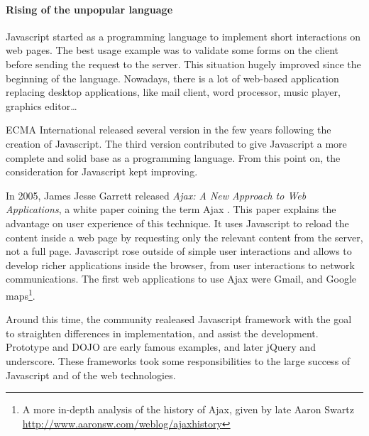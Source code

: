 
\paragraph{Rising of the unpopular language}


Javascript started as a programming language to implement short interactions on web pages.
The best usage example was to validate some forms on the client before sending the request to the server.
This situation hugely improved since the beginning of the language.
Nowadays, there is a lot of web-based application replacing desktop applications, like mail client, word processor, music player, graphics editor…

ECMA International released several version in the few years following the creation of Javascript.
The third version contributed to give Javascript a more complete and solid base as a programming language.
From this point on, the consideration for Javascript kept improving.

In 2005, James Jesse Garrett released \textit{Ajax: A New Approach to Web Applications}, a white paper coining the term Ajax \cite{Garrett2005}.
This paper explains the advantage on user experience of this technique.
It uses Javascript to reload the content inside a web page by requesting only the relevant content from the server, not a full page.
Javascript rose outside of simple user interactions and allows to develop richer applications inside the browser, from user interactions to network communications.
The first web applications to use Ajax were Gmail, and Google maps\footnote{A more in-depth analysis of the history of Ajax, given by late Aaron Swartz \url{http://www.aaronsw.com/weblog/ajaxhistory}}.

Around this time, the community realeased Javascript framework with the goal to straighten differences in implementation, and assist the development.
Prototype and DOJO are early famous examples, and later jQuery and underscore.
These frameworks took some responsibilities to the large success of Javascript and of the web technologies.

